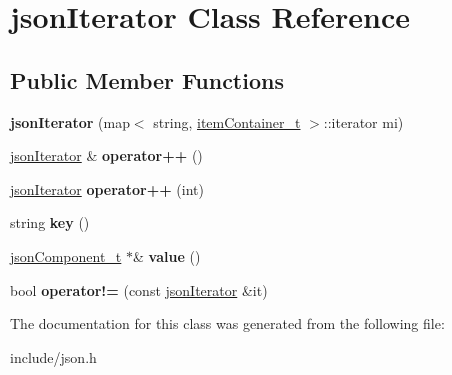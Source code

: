 \hypertarget{classjsonIterator}{\section{json\-Iterator \-Class \-Reference}
\label{classjsonIterator}
}
\subsection*{\-Public \-Member \-Functions}
\begin{DoxyCompactItemize}
\item 
\hypertarget{classjsonIterator_a4cebaf999b441afb07bc4039c3a84a95}{{\bfseries json\-Iterator} (map$<$ string, \hyperlink{classitemContainer__t}{item\-Container\-\_\-t} $>$\-::iterator mi)}\label{classjsonIterator_a4cebaf999b441afb07bc4039c3a84a95}

\item 
\hypertarget{classjsonIterator_a512d9041b60be8205818a0c03b9e35e7}{\hyperlink{classjsonIterator}{json\-Iterator} \& {\bfseries operator++} ()}\label{classjsonIterator_a512d9041b60be8205818a0c03b9e35e7}

\item 
\hypertarget{classjsonIterator_a2dee3bb56dd07d24a758af5fd1cba195}{\hyperlink{classjsonIterator}{json\-Iterator} {\bfseries operator++} (int)}\label{classjsonIterator_a2dee3bb56dd07d24a758af5fd1cba195}

\item 
\hypertarget{classjsonIterator_acb7b50565d54b6f4783c35e0adb870e3}{string {\bfseries key} ()}\label{classjsonIterator_acb7b50565d54b6f4783c35e0adb870e3}

\item 
\hypertarget{classjsonIterator_a593391a717689d4eaf728e06bae1bcef}{\hyperlink{classjsonComponent__t}{json\-Component\-\_\-t} $\ast$\& {\bfseries value} ()}\label{classjsonIterator_a593391a717689d4eaf728e06bae1bcef}

\item 
\hypertarget{classjsonIterator_ad863594aaa74d816981a71a4012e4b4a}{bool {\bfseries operator!=} (const \hyperlink{classjsonIterator}{json\-Iterator} \&it)}\label{classjsonIterator_ad863594aaa74d816981a71a4012e4b4a}

\end{DoxyCompactItemize}


\-The documentation for this class was generated from the following file\-:\begin{DoxyCompactItemize}
\item 
include/json.\-h\end{DoxyCompactItemize}
